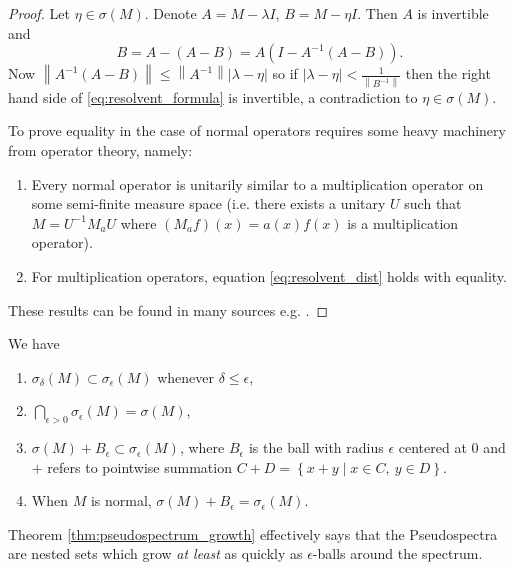 \begin{proof}
    Let $\eta \in \sigma (M)$. Denote $A = M - \lambda I$, $B = M - \eta I$. Then $A$ is 
    invertible and 
    \begin{equation}
        \label{eq:resolvent_formula}
        B = A - (A - B) = A (I - A^{-1} (A - B)) . 
    \end{equation}
    Now 
    $\left\| A^{-1} (A - B) \right\| \leq \left\| A^{-1} \right\| \left| \lambda - \eta \right|$
    so if $| \lambda - \eta | < \frac{1}{\left\| B^{-1} \right\|}$ then the right hand 
    side of \ref{eq:resolvent_formula} is invertible, a contradiction to 
    $\eta \in \sigma (M)$. 

    To prove equality in the case of normal operators requires some heavy machinery from 
    operator theory, namely:
    \begin{enumerate}
        \item Every normal operator is unitarily similar to a multiplication operator 
            on some semi-finite measure space (i.e. there exists a unitary $U$ such that 
            $M = U^{-1} M_a U$ where $(M_a f) (x) = a(x) f(x)$ is a multiplication 
            operator). 
        \item For multiplication operators, equation \ref{eq:resolvent_dist} holds with 
            equality. 
    \end{enumerate}
    These results can be found in many sources e.g. \cite{barrysimon}. 
\end{proof}

\begin{theorem}
    \label{thm:pseudospectrum_growth}
    We have
    \begin{enumerate}
        \item $\sigma_\delta (M) \subset \sigma_\epsilon (M)$ whenever $\delta \leq \epsilon$,
        \item $\bigcap_{\epsilon > 0} \sigma_\epsilon (M) = \sigma (M)$,  
        \item $\sigma (M) + B_\epsilon \subset \sigma_\epsilon (M)$, where $B_\epsilon$ is 
            the ball with radius $\epsilon$ centered at $0$ and $+$ refers to pointwise 
            summation $C + D = \left\{ x + y \mid x \in C,\ y \in D \right\}$. 
        \item When $M$ is normal, $\sigma (M) + B_\epsilon = \sigma_\epsilon (M)$. 
    \end{enumerate}
\end{theorem}

\begin{remark}
    Theorem \ref{thm:pseudospectrum_growth} effectively says that the Pseudospectra are 
    nested sets which grow \emph{at least} as quickly as $\epsilon$-balls around the 
    spectrum. 
\end{remark}

